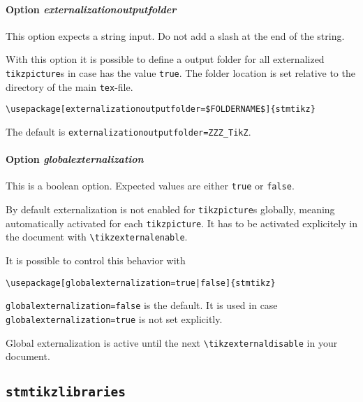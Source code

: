 \documentclass[%
  type=article,%
  layout=koma,%
  date=true,%
  hyperref=true,%
  listings=true,%
  tikz=false,%
]{stmtext}
\begin{document}
\paragraph{Option \protect\textit{externalizationoutputfolder}}
\label{sec:usage:preamble:wholepackage:options:outputfolder}

This option expects a string input. Do not add a slash at the end of the string.

With this option it is possible to define a output folder for all externalized \texttt{tikzpicture}s in case  has the value \texttt{true}. The folder location is set relative to the directory of the main \texttt{tex}-file.

\begin{verbatim}
\usepackage[externalizationoutputfolder=$FOLDERNAME$]{stmtikz}
\end{verbatim}

The default is \texttt{externalizationoutputfolder=ZZZ\_TikZ}.

\paragraph{Option \protect\textit{globalexternalization}}
\label{sec:usage:preamble:wholepackage:options:globalexternalization}

This is a boolean option.  Expected values are either \texttt{true} or \texttt{false}. 

By default externalization is not enabled for \texttt{tikzpicture}s globally, meaning automatically activated for each \texttt{tikzpicture}. It has to be activated explicitely in the document with \texttt{\textbackslash tikzexternalenable}.

It is possible to control this behavior with 

\begin{verbatim}
\usepackage[globalexternalization=true|false]{stmtikz}
\end{verbatim}

\texttt{globalexternalization=false} is the default. It is used in case \texttt{globalexternalization=true} is not set explicitly.

Global externalization is active until the next \texttt{\textbackslash tikzexternaldisable} in your document.

\subsection{\protect\texttt{stmtikzlibraries}}
\label{sec:usage:preamble:libraries}
\end{document}
